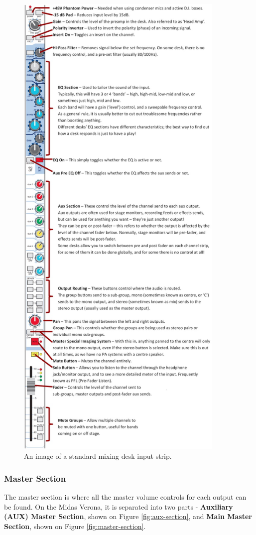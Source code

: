 \documentclass[14pt,twocolumn]{extarticle} %
\begin{document}
\begin{figure}[h]
\begin{center}

\includegraphics[width=10cm]{channel-strip.jpg}
\caption{An image of a standard mixing desk input strip.}
\label{fig:channel-strip}

\end{center}
\end{figure}

\subsubsection{Master Section}
\label{master-section}
The master section is where all the master volume controls for each output can be found. On the Midas Verona, it is separated into two parts - \textbf{Auxiliary (AUX) Master Section}, shown on Figure \ref{fig:aux-section}, and \textbf{Main Master Section}, shown on Figure \ref{fig:master-section}.
\end{document}
